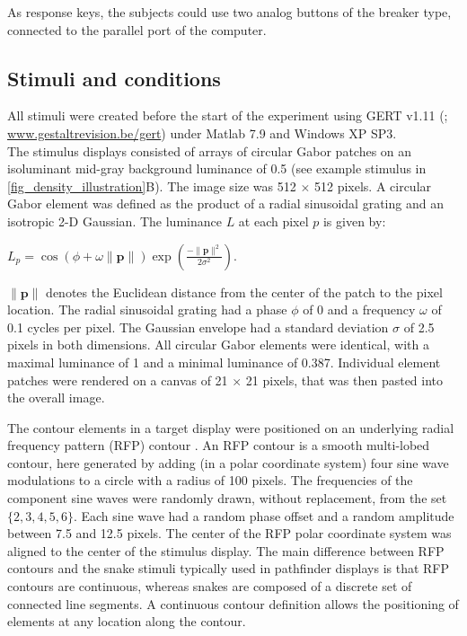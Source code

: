 \documentclass[12pt]{article}
\begin{document}
As response keys, the subjects could use two analog buttons of the breaker type, connected to the parallel port of the computer.

\subsection{Stimuli and conditions}\label{subsection_methods_stimuli}

All stimuli were created before the start of the experiment using GERT v1.11 (; \href{http://www.gestaltrevision.be/gert}{www.gestaltrevision.be/gert}) under Matlab 7.9 and Windows XP SP3.\\

The stimulus displays consisted of arrays of circular Gabor patches on an isoluminant mid-gray background luminance of 0.5 (see example stimulus in \autoref{fig_density_illustration}B). The image size was 512 $\times$ 512 pixels. A circular Gabor element was defined as the product of a radial sinusoidal grating and an isotropic 2-D Gaussian. The luminance $L$ at each pixel $p$ is given by:
\begin{center}$L _p = \cos(\phi + \omega \lVert \mathbf{p} \rVert)\exp{(\frac{-\lVert \mathbf{p} \rVert ^{2}}{2\sigma^{2}})}$.\\\end{center}

$\lVert \mathbf{p} \rVert$  denotes the Euclidean distance from the center of the patch to the pixel location. The radial sinusoidal grating had a phase $\phi$ of 0 and a frequency $\omega$ of 0.1 cycles per pixel. The Gaussian envelope had a standard deviation $\sigma$ of 2.5 pixels in both dimensions. All circular Gabor elements were identical, with a maximal luminance of 1 and a minimal luminance of 0.387. Individual element patches were rendered on a canvas of 21 $\times$ 21 pixels, that was then pasted into the overall image.

The contour elements in a target display were positioned on an underlying radial frequency pattern (RFP) contour \cite{WilkinsonEtAl98}. An RFP contour is a smooth multi-lobed contour, here generated by adding (in a polar coordinate system) four sine wave modulations to a circle with a radius of 100 pixels. The frequencies of the component sine waves were randomly drawn, without replacement, from the set $\{2,3,4,5,6\}$. Each sine wave had a random phase offset and a random amplitude between 7.5 and 12.5 pixels. The center of the RFP polar coordinate system was aligned to the center of the stimulus display. The main difference between RFP contours and the snake stimuli typically used in pathfinder displays is that RFP contours are continuous, whereas snakes are composed of a discrete set of connected line segments. A continuous contour definition allows the positioning of elements at any location along the contour.\\
\end{document}
